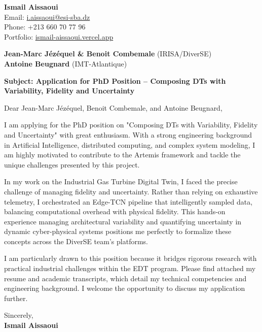 \documentclass[11pt,a4paper]{article}
\begin{document}
\thispagestyle{empty}

\begin{flushright}
\textbf{Ismail Aissaoui} \\
Email: \href{mailto:i.aissaoui@esi-sba.dz}{i.aissaoui@esi-sba.dz} \\
Phone: +213 660 70 77 96 \\
Portfolio: \href{https://ismail-aissaoui.vercel.app}{ismail-aissaoui.vercel.app}
\end{flushright}

\vspace{1em}

\begin{flushleft}
\textbf{Jean-Marc Jézéquel \& Benoit Combemale} (IRISA/DiverSE) \\
\textbf{Antoine Beugnard} (IMT-Atlantique)
\end{flushleft}

\vspace{1em}
\noindent\textbf{Subject: Application for PhD Position -- Composing DTs with Variability, Fidelity and Uncertainty}
\vspace{1em}

\noindent Dear Jean-Marc Jézéquel, Benoit Combemale, and Antoine Beugnard,

\vspace{1em}
\noindent
I am applying for the PhD position on "Composing DTs with Variability, Fidelity and Uncertainty" with great enthusiasm. With a strong engineering background in Artificial Intelligence, distributed computing, and complex system modeling, I am highly motivated to contribute to the Artemis framework and tackle the unique challenges presented by this project.

\vspace{0.5em}
\noindent
In my work on the Industrial Gas Turbine Digital Twin, I faced the precise challenge of managing fidelity and uncertainty. Rather than relying on exhaustive telemetry, I orchestrated an Edge-TCN pipeline that intelligently sampled data, balancing computational overhead with physical fidelity. This hands-on experience managing architectural variability and quantifying uncertainty in dynamic cyber-physical systems positions me perfectly to formalize these concepts across the DiverSE team's platforms.

\vspace{0.5em}
\noindent
I am particularly drawn to this position because it bridges rigorous research with practical industrial challenges within the EDT program. Please find attached my resume and academic transcripts, which detail my technical competencies and engineering background. I welcome the opportunity to discuss my application further.

\vspace{1.5em}
\noindent
Sincerely, \\[0.5em]
\textbf{Ismail Aissaoui}
\end{document}
